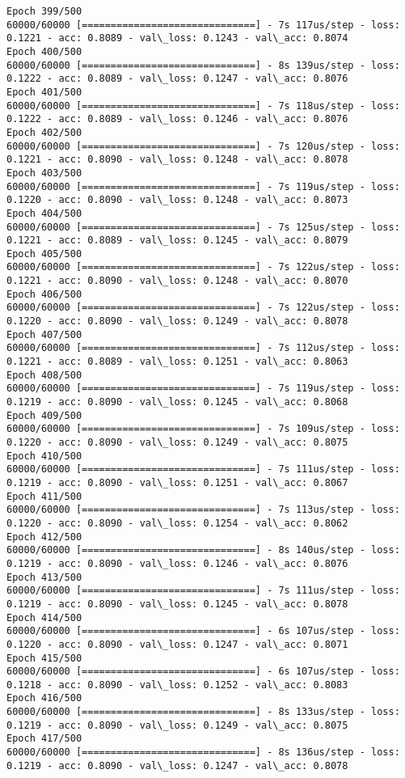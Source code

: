 \documentclass[11pt]{article}
\begin{document}
\begin{Verbatim}[commandchars=\\\{\}]
Epoch 399/500
60000/60000 [==============================] - 7s 117us/step - loss: 0.1221 - acc: 0.8089 - val\_loss: 0.1243 - val\_acc: 0.8074
Epoch 400/500
60000/60000 [==============================] - 8s 139us/step - loss: 0.1222 - acc: 0.8089 - val\_loss: 0.1247 - val\_acc: 0.8076
Epoch 401/500
60000/60000 [==============================] - 7s 118us/step - loss: 0.1222 - acc: 0.8089 - val\_loss: 0.1246 - val\_acc: 0.8076
Epoch 402/500
60000/60000 [==============================] - 7s 120us/step - loss: 0.1221 - acc: 0.8090 - val\_loss: 0.1248 - val\_acc: 0.8078
Epoch 403/500
60000/60000 [==============================] - 7s 119us/step - loss: 0.1220 - acc: 0.8090 - val\_loss: 0.1248 - val\_acc: 0.8073
Epoch 404/500
60000/60000 [==============================] - 7s 125us/step - loss: 0.1221 - acc: 0.8089 - val\_loss: 0.1245 - val\_acc: 0.8079
Epoch 405/500
60000/60000 [==============================] - 7s 122us/step - loss: 0.1221 - acc: 0.8090 - val\_loss: 0.1248 - val\_acc: 0.8070
Epoch 406/500
60000/60000 [==============================] - 7s 122us/step - loss: 0.1220 - acc: 0.8090 - val\_loss: 0.1249 - val\_acc: 0.8078
Epoch 407/500
60000/60000 [==============================] - 7s 112us/step - loss: 0.1221 - acc: 0.8089 - val\_loss: 0.1251 - val\_acc: 0.8063
Epoch 408/500
60000/60000 [==============================] - 7s 119us/step - loss: 0.1219 - acc: 0.8090 - val\_loss: 0.1245 - val\_acc: 0.8068
Epoch 409/500
60000/60000 [==============================] - 7s 109us/step - loss: 0.1220 - acc: 0.8090 - val\_loss: 0.1249 - val\_acc: 0.8075
Epoch 410/500
60000/60000 [==============================] - 7s 111us/step - loss: 0.1219 - acc: 0.8090 - val\_loss: 0.1251 - val\_acc: 0.8067
Epoch 411/500
60000/60000 [==============================] - 7s 113us/step - loss: 0.1220 - acc: 0.8090 - val\_loss: 0.1254 - val\_acc: 0.8062
Epoch 412/500
60000/60000 [==============================] - 8s 140us/step - loss: 0.1219 - acc: 0.8090 - val\_loss: 0.1246 - val\_acc: 0.8076
Epoch 413/500
60000/60000 [==============================] - 7s 111us/step - loss: 0.1219 - acc: 0.8090 - val\_loss: 0.1245 - val\_acc: 0.8078
Epoch 414/500
60000/60000 [==============================] - 6s 107us/step - loss: 0.1220 - acc: 0.8090 - val\_loss: 0.1247 - val\_acc: 0.8071
Epoch 415/500
60000/60000 [==============================] - 6s 107us/step - loss: 0.1218 - acc: 0.8090 - val\_loss: 0.1252 - val\_acc: 0.8083
Epoch 416/500
60000/60000 [==============================] - 8s 133us/step - loss: 0.1219 - acc: 0.8090 - val\_loss: 0.1249 - val\_acc: 0.8075
Epoch 417/500
60000/60000 [==============================] - 8s 136us/step - loss: 0.1219 - acc: 0.8090 - val\_loss: 0.1247 - val\_acc: 0.8078

\end{Verbatim}
\end{document}
